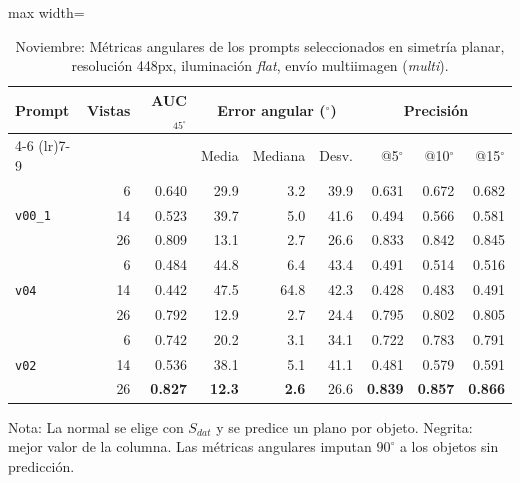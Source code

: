 \begin{table}[htbp]
\centering
\caption{Noviembre: Métricas angulares de los prompts seleccionados en simetría planar, resolución 448px, iluminación \textit{flat}, envío multiimagen (\textit{multi}).}
\label{tab:nov_plane_448_angular}
\begin{lrbox}{\tablebox}
\begin{adjustbox}{max width=\textwidth}
\begin{tabular}{lrrrrrrrr}
\toprule
\multirow{2}{*}{Prompt} & \multirow{2}{*}{Vistas} & \multirow{2}{*}{AUC$_{45^\circ}$} & \multicolumn{3}{c}{Error angular ($^\circ$)} & \multicolumn{3}{c}{Precisión} \\
\cmidrule(lr){4-6} \cmidrule(lr){7-9}
 &  &  & Media & Mediana & Desv. & @5$^\circ$ & @10$^\circ$ & @15$^\circ$ \\
\midrule
\multirow{3}{*}{\texttt{v00\_1}} & 6 & 0.640 & 29.9 & 3.2 & 39.9 & 0.631 & 0.672 & 0.682 \\
 & 14 & 0.523 & 39.7 & 5.0 & 41.6 & 0.494 & 0.566 & 0.581 \\
 & 26 & 0.809 & 13.1 & 2.7 & 26.6 & 0.833 & 0.842 & 0.845 \\
\midrule
\multirow{3}{*}{\texttt{v04}} & 6 & 0.484 & 44.8 & 6.4 & 43.4 & 0.491 & 0.514 & 0.516 \\
 & 14 & 0.442 & 47.5 & 64.8 & 42.3 & 0.428 & 0.483 & 0.491 \\
 & 26 & 0.792 & 12.9 & 2.7 & 24.4 & 0.795 & 0.802 & 0.805 \\
\midrule
\multirow{3}{*}{\texttt{v02}} & 6 & 0.742 & 20.2 & 3.1 & 34.1 & 0.722 & 0.783 & 0.791 \\
 & 14 & 0.536 & 38.1 & 5.1 & 41.1 & 0.481 & 0.579 & 0.591 \\
 & 26 & \textbf{0.827} & \textbf{12.3} & \textbf{2.6} & 26.6 & \textbf{0.839} & \textbf{0.857} & \textbf{0.866} \\
\bottomrule
\end{tabular}
\end{adjustbox}
\end{lrbox}
\usebox{\tablebox}

\vspace{1.5ex}
\begin{minipage}{\wd\tablebox}
\footnotesize
Nota: La normal se elige con $S_{dat}$ y se predice un plano por objeto. Negrita: mejor valor de la columna. Las métricas angulares imputan $90^\circ$ a los objetos sin predicción.
\end{minipage}
\end{table}

